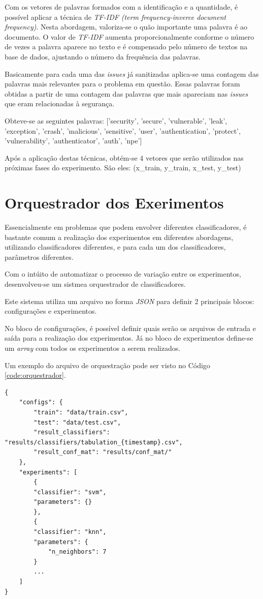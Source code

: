 \documentclass[conference]{IEEEtran}
\begin{document}
Com os vetores de palavras formados com a identificação e a quantidade, é possível aplicar a técnica de \textit{TF-IDF (term frequency-inverce document frequency)}. Nesta abordagem, valoriza-se o quão importante uma palavra é ao documento. O valor de \textit{TF-IDF} aumenta proporcionalmente conforme o número de vezes a palavra aparece no texto e é compensado pelo número de textos na base de dados, ajustando o número da frequência das palavras.

Basicamente para cada uma das \textit{issues} já sanitizadas aplica-se uma contagem das palavras mais relevantes para o problema em questão. Essas palavras foram obtidas a partir de uma contagem das palavras que mais apareciam nas \textit{issues} que eram relacionadas à segurança.

Obteve-se as seguintes palavras: ['security', 'secure', 'vulnerable', 'leak', 'exception', 'crash', 'malicious',
'sensitive', 'user', 'authentication', 'protect', 'vulnerability', 'authenticator', 'auth', 'npe']

Após a aplicação destas técnicas, obtém-se 4 vetores que serão utilizados nas próximas fases do experimento. São eles: (x\_train, y\_train, x\_test, y\_test)

\section{Orquestrador dos Exerimentos}

Essencialmente em problemas que podem envolver diferentes classificadores, é bastante comum a realização dos experimentos em diferentes abordagens, utilizando classificadores diferentes, e para cada um dos classificadores, parâmetros diferentes.

Com o intúito de automatizar o processo de variação entre os experimentos, desenvolveu-se um sistmea orquestrador de classificadores.

Este sistema utiliza um arquivo no forma \textit{JSON} para definir 2 principais blocos: configurações e experimentos.

No bloco de configurações, é possível definir quais serão os arquivos de entrada e saída para a realização dos experimentos. Já no bloco de experimentos define-se um \textit{array} com todos os experimentos a serem realizados.

Um exemplo do arquivo de orquestração pode ser visto no Código \ref{code:orquestrador}.

\begin{lstlisting}[caption={JSON do Orquestrador},captionpos=b,frame=single,label={code:orquestrador}]
{
    "configs": {
        "train": "data/train.csv",
        "test": "data/test.csv",
        "result_classifiers": "results/classifiers/tabulation_{timestamp}.csv",
        "result_conf_mat": "results/conf_mat/"
    },
    "experiments": [
        {
        "classifier": "svm",
        "parameters": {}
        },
        {
        "classifier": "knn",
        "parameters": {
            "n_neighbors": 7
        }
        ...
    ]
}
\end{lstlisting}
\end{document}
